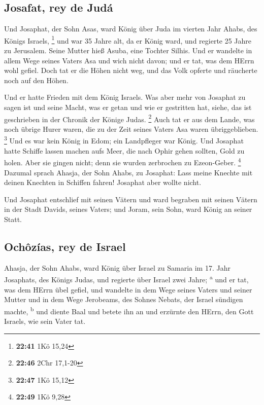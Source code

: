 \hypertarget{josafat-rey-de-juduxe1}{%
\subsection{Josafat, rey de Judá}\label{josafat-rey-de-juduxe1}}

 Und Josaphat, der Sohn Asas, ward König über Juda im
vierten Jahr Ahabs, des Königs Israels, \footnote{\textbf{22:41} 1Kö
  15,24}  und war 35 Jahre alt, da er König ward, und
regierte 25 Jahre zu Jerusalem. Seine Mutter hieß Asuba, eine Tochter
Silhis.  Und er wandelte in allem Wege seines Vaters Asa
und wich nicht davon; und er tat, was dem HErrn wohl gefiel.
 Doch tat er die Höhen nicht weg, und das Volk opferte
und räucherte noch auf den Höhen.

 Und er hatte Frieden mit dem König Israels.
 Was aber mehr von Josaphat zu sagen ist und seine Macht,
was er getan und wie er gestritten hat, siehe, das ist geschrieben in
der Chronik der Könige Judas. \footnote{\textbf{22:46} 2Chr 17,1-20}
 Auch tat er aus dem Lande, was noch übrige Hurer waren,
die zu der Zeit seines Vaters Asa waren übriggeblieben. \footnote{\textbf{22:47}
  1Kö 15,12}  Und es war kein König in Edom; ein
Landpfleger war König.  Und Josaphat hatte Schiffe lassen
machen aufs Meer, die nach Ophir gehen sollten, Gold zu holen. Aber sie
gingen nicht; denn sie wurden zerbrochen zu Ezeon-Geber. \footnote{\textbf{22:49}
  1Kö 9,28}  Dazumal sprach Ahasja, der Sohn Ahabs, zu
Josaphat: Lass meine Knechte mit deinen Knechten in Schiffen fahren!
Josaphat aber wollte nicht.

 Und Josaphat entschlief mit seinen Vätern und ward
begraben mit seinen Vätern in der Stadt Davids, seines Vaters; und
Joram, sein Sohn, ward König an seiner Statt.

\hypertarget{ochuxf4zuxedas-rey-de-israel}{%
\subsection{Ochôzías, rey de
Israel}\label{ochuxf4zuxedas-rey-de-israel}}

 Ahasja, der Sohn Ahabs, ward König über Israel zu
Samaria im 17. Jahr Josaphats, des Königs Judas, und regierte über
Israel zwei Jahre; \textsuperscript{a}  und er tat, was
dem HErrn übel gefiel, und wandelte in dem Wege seines Vaters und seiner
Mutter und in dem Wege Jerobeams, des Sohnes Nebats, der Israel sündigen
machte, \textsuperscript{b}  und diente Baal und betete
ihn an und erzürnte den HErrn, den Gott Israels, wie sein Vater tat.
